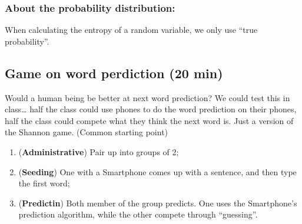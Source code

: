 \documentclass[12pt]{article}
\theoremstyle{definition}
\theoremstyle{plain}
\begin{document}
\subsubsection{About the probability distribution:}
When calculating the entropy of a random variable, we only use ``true
probability''.



\subsection{Game on word perdiction (20 min)}
Would a human being be better at next word prediction?  We could test this in
class…  half the class could use phones to do the word prediction on their
phones, half the class could compete what they think the next word is.  Just a
version of the Shannon game.
(Common starting point)
\begin{enumerate}[{Stage} 1]
    \item (\textbf{Administrative}) Pair up into groups of 2;
    \item (\textbf{Seeding}) One with a Smartphone comes up with a sentence, and then type the
        first word;
    \item (\textbf{Predictin}) Both member of the group predicts. One uses the
        Smartphone's prediction algorithm, while the other compete through
        ``guessing''.
\end{enumerate}
\end{document}
